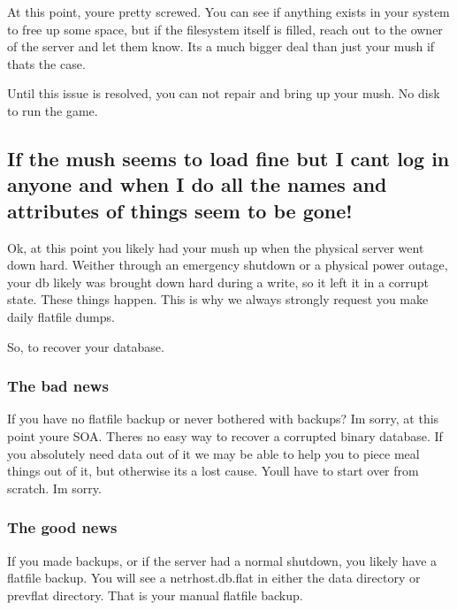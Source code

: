\documentclass[letterpaper,10pt,english]{sphinxmanual}
\begin{document}
\sphinxAtStartPar
At this point, you\textquotesingle{}re pretty screwed.  You can see if anything exists
in your system to free up some space, but if the filesystem itself
is filled, reach out to the owner of the server and let them know.
It\textquotesingle{}s a much bigger deal than just your mush if that\textquotesingle{}s the case.

\sphinxAtStartPar
Until this issue is resolved, you can not repair and bring up your mush.
No disk to run the game.


\subsection{If the mush seems to load fine but I can\textquotesingle{}t log in anyone and when I do all the names and attributes of things seem to be gone!}
\label{\detokenize{troubleshooting:if-the-mush-seems-to-load-fine-but-i-can-t-log-in-anyone-and-when-i-do-all-the-names-and-attributes-of-things-seem-to-be-gone}}
\sphinxAtStartPar
Ok, at this point you likely had your mush up when the physical server
went down hard.  Weither through an emergency shutdown or a physical
power outage, your db likely was brought down hard during a write,
so it left it in a corrupt state.  These things happen.  This is
why we always strongly request you make daily flatfile dumps.

\sphinxAtStartPar
So, to recover your database.


\subsubsection{The bad news}
\label{\detokenize{troubleshooting:the-bad-news}}
\sphinxAtStartPar
If you have no flatfile backup or never bothered with backups?
I\textquotesingle{}m sorry, at this point you\textquotesingle{}re SOA.  There\textquotesingle{}s no easy way to
recover a corrupted binary database.  If you absolutely need
data out of it we may be able to help you to piece meal things
out of it, but otherwise it\textquotesingle{}s a lost cause.  You\textquotesingle{}ll have to start
over from scratch.  I\textquotesingle{}m sorry.


\subsubsection{The good news}
\label{\detokenize{troubleshooting:the-good-news}}
\sphinxAtStartPar
If you made backups, or if the server had a normal shutdown, you
likely have a flatfile backup.  You will see a netrhost.db.flat
in either the \textquotesingle{}data\textquotesingle{} directory or \textquotesingle{}prevflat\textquotesingle{} directory.  That
is your manual flatfile backup.
\end{document}
